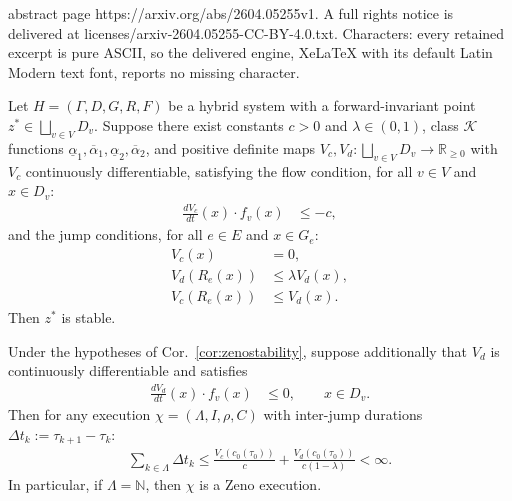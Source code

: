 \documentclass[10pt,a4paper]{amsart}
\newcommand{\K}{\mathcal K}
\newcommand{\N}{\mathbb N}
\newcommand{\R}{\mathbb R}
\newcommand{\maps}{\colon}
\begin{document}
abstract page https://arxiv.org/abs/2604.05255v1. A full rights notice is delivered at licenses/arxiv-2604.05255-CC-BY-4.0.txt. Characters: every retained excerpt is pure ASCII, so the delivered engine, XeLaTeX with its default Latin Modern text font, reports no missing character.
\begin{cor}\label{cor:zenostability}
    Let $H = (\Gamma, D, G, R, F)$ be a hybrid system with a forward-invariant point $z^* \in \bigsqcup_{v \in V} D_v$. Suppose there exist constants $c > 0$ and $\lambda \in (0,1)$, class $\K$ functions $\underline{\alpha}_1, \overline{\alpha}_1, \underline{\alpha}_2, \overline{\alpha}_2$, and positive definite maps $V_c, V_d \maps \bigsqcup_{v \in V} D_v \to \R_{\geq 0}$ with $V_c$ continuously differentiable, satisfying 
    the flow condition, for all $v \in V$ and $x \in D_v$:
    \begin{align}
        \frac{dV_c}{dt}(x) \cdot f_v(x) &\leq -c, \label{eq:zeno_flow2}
    \end{align}
    and the jump conditions, for all $e \in E$ and $x \in G_e$:
    \begin{align}
        V_c(x) &= 0, \label{eq:zeno_guard2} \\
        V_d(R_e(x)) &\leq \lambda  V_d(x), \label{eq:zeno_jump_Vd2} \\
        V_c(R_e(x)) &\leq V_d(x). \label{eq:zeno_jump_Vc2}
    \end{align}
    Then $z^*$ is stable.
\end{cor}

\begin{thm}\label{thm:ZenoStability}
    Under the hypotheses of Cor.~\ref{cor:zenostability}, suppose additionally that $V_d$ is continuously differentiable and satisfies
    \begin{align}
        \frac{dV_d}{dt}(x) \cdot f_v(x) &\leq 0, \qquad x \in D_v. \label{eq:zeno_flow_Vd}
    \end{align}
    Then for any execution $\chi = (\Lambda, I, \rho, C)$ with inter-jump durations $\Delta t_k := \tau_{k+1} - \tau_k$:
    \begin{align}
        \sum_{k \in \Lambda} \Delta t_k \leq \frac{V_c(c_0(\tau_0))}{c} + \frac{V_d(c_0(\tau_0))}{c(1 - \lambda)} < \infty. \label{eq:zenobound}
    \end{align}
    In particular, if $\Lambda = \N$, then $\chi$ is a Zeno execution.
\end{thm}
\end{document}
